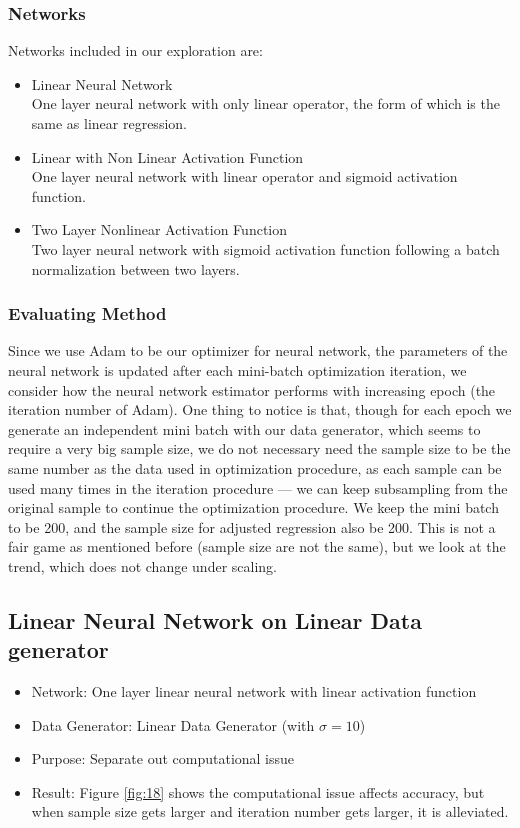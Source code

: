 \documentclass[11pt,paper=letter]{scrartcl}
\begin{document}
\subsubsection{Networks}
Networks included in our exploration are:
\begin{itemize}
\item Linear Neural Network\\
	One layer neural network with only linear operator, the form of which is the same as linear regression.
\item Linear with Non Linear Activation Function \\
	One layer neural network with linear operator and sigmoid activation function.
\item Two Layer Nonlinear Activation Function \\
	Two layer neural network with sigmoid activation function following a batch normalization between two layers.
\end{itemize}

\subsubsection{Evaluating Method}
Since we use Adam to be our optimizer for neural network, the parameters of the neural network is updated after each mini-batch optimization iteration, we consider how the neural network estimator performs with increasing epoch (the iteration number of Adam). One thing to notice is that, though for each epoch we generate an independent mini batch with our data generator, which seems to require a very big sample size, we do not necessary need the sample size to be the same number as the data used in optimization procedure, as each sample can be used many times in the iteration procedure --- we can keep subsampling from the original sample to continue the optimization procedure. We keep the mini batch to be 200, and the sample size for adjusted regression also be 200. This is not a fair game as mentioned before (sample size are not the same), but we look at the trend, which does not change under scaling. 


\subsection{Linear Neural Network on Linear Data generator}
\begin{itemize}
\item Network: One layer linear neural network with linear activation function
\item Data Generator: Linear Data Generator (with $\sigma=10$)
\item Purpose: Separate out computational issue
\item Result: Figure \ref{fig:18} shows the computational issue affects accuracy, but when sample size gets larger and iteration number gets larger, it is alleviated. 
\end{itemize}
\end{document}
